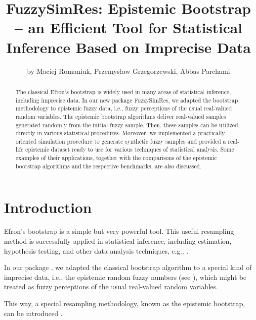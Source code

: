 
\title{FuzzySimRes: Epistemic Bootstrap -- an Efficient Tool for Statistical Inference Based on Imprecise Data}

\author{by Maciej Romaniuk, Przemys{\l}aw Grzegorzewski, Abbas Parchami}

\maketitle

\begin{abstract}
The classical Efron's bootstrap is widely used in many areas of statistical inference, including imprecise data. In our new package FuzzySimRes, we adapted the bootstrap methodology to epistemic fuzzy data, i.e., fuzzy perceptions of the usual real-valued random variables. The epistemic bootstrap algorithms deliver real-valued samples generated randomly from the initial fuzzy sample. Then, these samples can be utilized directly in various statistical procedures. Moreover, we implemented a practically oriented simulation procedure to generate synthetic fuzzy samples and provided a real-life epistemic dataset ready to use for various techniques of statistical analysis. Some examples of their applications, together with the comparisons of the epistemic bootstrap algorithms and the respective benchmarks, are also discussed.
\end{abstract}


\section{Introduction} 
\label{intro}

Efron's bootstrap \citep{EfroTibs93} is a simple but very powerful tool. This useful resampling method is successfully applied in statistical inference, including estimation, hypothesis testing, and other data analysis techniques, e.g., \cite{davison_hinkley_1997,ISLR,romaniuk2019}.

In our package , we adapted the classical bootstrap algorithm to a special kind of imprecise data, i.e., the epistemic random fuzzy numbers (see \cite{Couso2014}), which might be treated as fuzzy perceptions of the usual real-valued random variables.

This way, a special resampling methodology, known as the epistemic bootstrap, can be introduced \citep{grzegorzewski2021,10.1007/978-3-031-08974-9_39,pgmr2022}.


